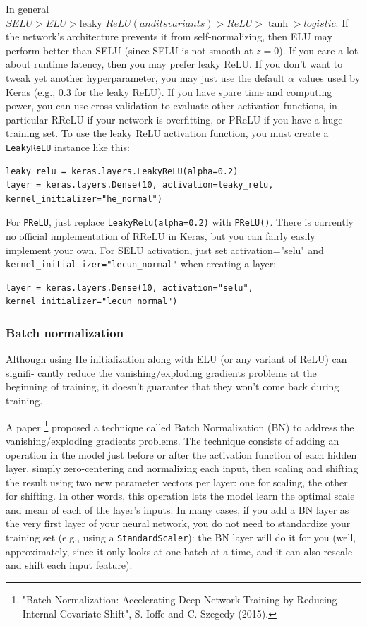 In general $SELU > ELU > \text{leaky }ReLU (and its variants) > ReLU > \tanh > logistic$. If the network's architecture prevents it from self-normalizing, then ELU may perform better than SELU (since SELU is not smooth at $z = 0$). If you care a lot about runtime latency, then you may prefer leaky ReLU. If you don't want to tweak yet another hyperparameter, you may just use the default $\alpha$ values used by Keras (e.g., $0.3$ for the leaky ReLU). If you have spare time and computing power, you can use cross-validation to evaluate other activation functions, in particular RReLU if your network is overfitting, or PReLU if you have a huge training set.
To use the leaky ReLU activation function, you must create a \lstinline+LeakyReLU+ instance like this:
\begin{lstlisting}
leaky_relu = keras.layers.LeakyReLU(alpha=0.2)
layer = keras.layers.Dense(10, activation=leaky_relu, kernel_initializer="he_normal")
\end{lstlisting}
For \lstinline+PReLU+, just replace \lstinline+LeakyRelu(alpha=0.2)+ with \lstinline+PReLU()+.
There is currently no official implementation of RReLU in Keras, but you can fairly easily implement your own. For SELU activation, just set activation="selu" and \lstinline+kernel_initial izer="lecun_normal"+ when creating a layer:
\begin{lstlisting}
layer = keras.layers.Dense(10, activation="selu", kernel_initializer="lecun_normal")
\end{lstlisting}

\subsubsection{Batch normalization}
Although using He initialization along with ELU (or any variant of ReLU) can signifi‐ cantly reduce the vanishing/exploding gradients problems at the beginning of training, it doesn’t guarantee that they won't come back during training.

A paper \footnote{"Batch Normalization: Accelerating Deep Network Training by Reducing Internal Covariate Shift", S. Ioffe and C. Szegedy (2015).} proposed a technique called Batch Normalization (BN) to address the vanishing/exploding gradients problems. The technique consists of adding an operation in the model just before or after the activation function of each hidden layer, simply zero-centering and normalizing each input, then scaling and shifting the result using two new parameter vectors per layer: one for scaling, the other for shifting. In other words, this operation lets the model learn the optimal scale and mean of each of the layer's inputs. In many cases, if you add a BN layer as the very first layer of your neural network, you do not need to standardize your training set (e.g., using a \lstinline+StandardScaler+): the BN layer will do it for you (well, approximately, since it only looks at one batch at a time, and it can also rescale and shift each input feature).

